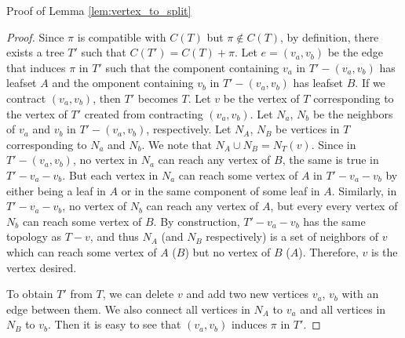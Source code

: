 \documentclass{bmcart}
\begin{document}
Proof of Lemma \ref{lem:vertex_to_split}
\begin{proof}
Since $\pi$ is compatible with $C(T)$ but $\pi \notin C(T)$, by definition, there exists a tree $T'$ such that $C(T') = C(T) + \pi$. Let $e = (v_a,v_b)$ be the edge that induces $\pi$ in $T'$ such that the component containing $v_a$ in $T'-(v_a,v_b)$ has leafset $A$ and the omponent containing $v_b$ in $T'-(v_a,v_b)$ has leafset $B$. If we contract $(v_a,v_b)$, then $T'$ becomes $T$. Let $v$ be the vertex of $T$ corresponding to the vertex of $T'$ created from contracting $(v_a,v_b)$. Let $N_a$, $N_b$ be the neighbors of $v_a$ and $v_b$ in $T'-(v_a,v_b)$, respectively. Let $N_A$, $N_B$ be vertices in $T$ corresponding to $N_a$ and $N_b$. We note that $N_A \cup N_B = N_T(v)$. Since in $T' -(v_a,v_b)$, no vertex in $N_a$ can reach any vertex of $B$, the same is true in $T' - v_a - v_b$. But each vertex in $N_a$ can reach some vertex of $A$ in $T' - v_a - v_b$ by either being a leaf in $A$ or in the same component of some leaf in $A$. Similarly, in $T' - v_a - v_b$, no vertex of $N_b$ can reach any vertex of $A$, but every every vertex of $N_b$ can reach some vertex of $B$. By construction, $T' - v_a - v_b$ has the same topology as $T - v$, and thus $N_A$ (and $N_B$ respectively) is a set of neighbors of $v$ which can reach some vertex of $A$ ($B$) but no vertex of $B$ ($A$). Therefore, $v$ is the vertex desired. 

To obtain $T'$ from $T$, we can delete $v$ and add two new vertices $v_a$, $v_b$ with an edge between them. We also connect all vertices in $N_A$ to $v_a$ and all vertices in $N_B$ to $v_b$. Then it is easy to see that $(v_a,v_b)$ induces $\pi$ in $T'$. 
\end{proof}

\end{document}
